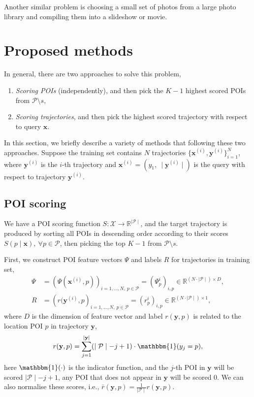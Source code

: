 \documentclass[9pt]{extarticle}
\begin{document}
Another similar problem is choosing a small set of photos from a large photo library and compiling them into a slideshow or movie.



\section{Proposed methods}
\label{sec:methods}

In general, there are two approaches to solve this problem,
\begin{enumerate}
\item \emph{Scoring POIs} (independently), and then pick the $K-1$ highest scored POIs from $\mathcal{P} \setminus s$,
\item \emph{Scoring trajectories}, and then pick the highest scored trajectory with respect to query $\mathbf{x}$.
\end{enumerate}

In this section, we briefly describe a variety of methods that following these two approaches.
Suppose the training set contains $N$ trajectories 
$\{ \mathbf{x}^{(i)}, \mathbf{y}^{(i)} \}_{i=1}^N$,
where $\mathbf{y}^{(i)}$ is the $i$-th trajectory and $\mathbf{x}^{(i)} = (y_1,~ \mid \mathbf{y}^{(i)} \mid)$ is the query 
with respect to trajectory $\mathbf{y}^{(i)}$.



\subsection{POI scoring}
\label{sec:scoring_point}

We have a POI scoring function $S: \mathcal{X} \to \mathbb{R}^{\mid \mathcal{P} \mid}$, 
and the target trajectory is produced by sorting all POIs in descending order according to their scores 
$S(p \mid \mathbf{x}),~ \forall p \in \mathcal{P}$,
then picking the top $K-1$ from $\mathcal{P} \setminus s$.

First, we construct POI feature vectors $\Psi$ and labels $R$ for trajectories in training set, 
\begin{align*}
\Psi &= \left( \Psi(\mathbf{x}^{(i)}, p) \right)_{i=1,\dots,N,~p \in \mathcal{P}} = \left( \Psi_p^i \right)_{i,p}
        \in \mathbb{R}^{(N \cdot \mid \mathcal{P} \mid) \times D}, \\
   R &= \left( r(\mathbf{y}^{(i)}, p \right)_{i=1,\dots,N,~p \in \mathcal{P}} = \left(r_p^i \right)_{i,p}
        \in \mathbb{R}^{(N \cdot \mid \mathcal{P} \mid) \times 1},
\end{align*}
where $D$ is the dimension of feature vector and label $r(\mathbf{y}, p)$ is related to the location POI $p$ in trajectory $\mathbf{y}$,
\begin{equation*}
r(\mathbf{y}, p) = \sum_{j=1}^{\mid \mathbf{y} \mid} (\mid \mathcal{P} \mid - j + 1) \cdot \mathbbm{1}(y_j = p),
\end{equation*}
here $\mathbbm{1}(\cdot)$ is the indicator function, and the $j$-th POI in $\mathbf{y}$ will be scored $\mid \mathcal{P} \mid - j + 1$, 
any POI that does not appear in $\mathbf{y}$ will be scored $0$.
We can also normalise these scores, i.e., $\bar{r}(\mathbf{y}, p) = \frac{1}{\mid \mathcal{P} \mid} r(\mathbf{y}, p)$.
\end{document}
